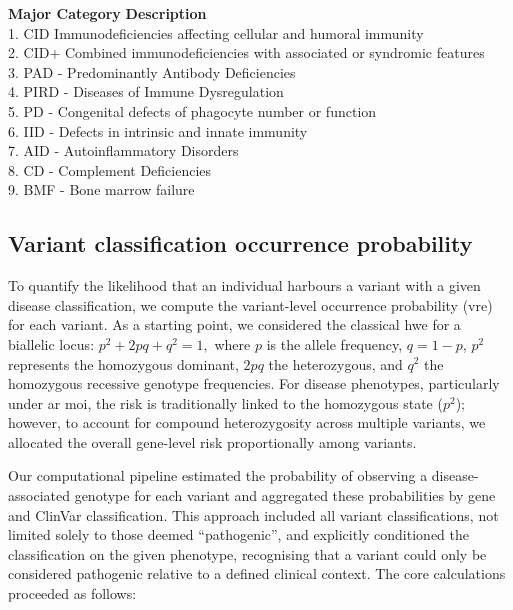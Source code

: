 \begin{tcolorbox}[
    colback=white!0,
    colframe=black!70,
    boxrule=1pt,
    arc=1mm,
    outer arc=1mm,
    title=\textbf{\refstepcounter{myboxcounter}\label{box:definitions}Box \themyboxcounter: definitions}
]
\textbf{Major Category} \hspace{4em} \textbf{Description}\\[5pt]
1. CID  Immunodeficiencies affecting cellular and humoral immunity\\[2pt]
2. CID+  Combined immunodeficiencies with associated or syndromic features\\[2pt]
3. PAD - Predominantly Antibody Deficiencies\\[2pt]
4. PIRD - Diseases of Immune Dysregulation\\[2pt]
5. PD - Congenital defects of phagocyte number or function\\[2pt]
6. IID - Defects in intrinsic and innate immunity\\[2pt]
7. AID - Autoinflammatory Disorders\\[2pt]
8. CD - Complement Deficiencies\\[2pt]
9. BMF - Bone marrow failure
\end{tcolorbox}

\subsection{Variant classification occurrence probability}
To quantify the likelihood that an individual harbours a variant with a given disease classification, we compute the variant-level occurrence probability (\ac{vre}) for each variant.
As a starting point, we considered the classical \ac{hwe} for a biallelic locus:
$
p^2 + 2pq + q^2 = 1,
$
where \(p\) is the allele frequency, \(q = 1 - p\), \(p^2\) represents the homozygous dominant, \(2pq\) the heterozygous, and \(q^2\) the homozygous recessive genotype frequencies. For disease phenotypes, particularly under \ac{ar} \ac{moi}, the risk is traditionally linked to the homozygous state (\(p^2\)); however, to account for compound heterozygosity across multiple variants, %
we allocated the overall gene-level risk proportionally among variants.

Our computational pipeline estimated the probability of observing a disease-associated genotype for each variant and aggregated these probabilities by gene and ClinVar classification. This approach included all variant classifications, not limited solely to those deemed ``pathogenic'', and explicitly conditioned the classification on the given phenotype, recognising that a variant could only be considered pathogenic relative to a defined clinical context. The core calculations proceeded as follows:

